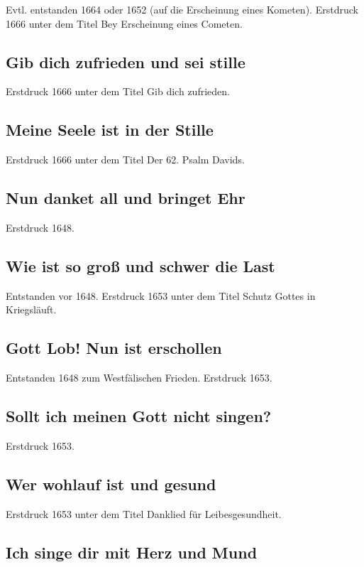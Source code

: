 Evtl. entstanden 1664 oder 1652 (auf die Erscheinung eines Kometen).
Erstdruck 1666 unter dem Titel \frqq Bey Erscheinung eines Cometen\flqq .

\subsection*{ Gib dich zufrieden und sei stille}

Erstdruck 1666 unter dem Titel \frqq Gib dich zufrieden\flqq .

\subsection*{ Meine Seele ist in der Stille}

Erstdruck 1666 unter dem Titel \frqq Der 62. Psalm Davids\flqq .

\subsection*{ Nun danket all und bringet Ehr}

Erstdruck 1648.

\subsection*{ Wie ist so groß und schwer die Last}

Entstanden vor 1648. Erstdruck 1653 unter dem Titel \frqq Schutz Gottes in
Kriegsläuft\flqq .

\subsection*{ Gott Lob! Nun ist erschollen}

Entstanden 1648 zum Westfälischen Frieden. Erstdruck 1653.

\subsection*{ Sollt ich meinen Gott nicht singen?}

Erstdruck 1653.

\subsection*{ Wer wohlauf ist und gesund}

Erstdruck 1653 unter dem Titel \frqq Danklied für Leibesgesundheit\flqq .

\subsection*{ Ich singe dir mit Herz und Mund}

